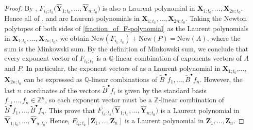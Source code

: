 \documentclass[11pt]{article}
\numberwithin{equation}{section}
\numberwithin{equation}{section}
\begin{document}
\begin{proof}
 By \cite[Theorem 3.1]{BCDX2023}, $F_{i_{k};t_{k}}\bigl(\mathbf{\hat{Y}}_{1;t_{0}},\dots,\mathbf{\hat{Y}}_{n;t_{0}}\bigr)$ is also a Laurent polynomial in $\mathbf{X}_{1;t_{0}},\dots,\mathbf{X}_{2n;t_{0}}$. Hence all of ,  and  are Laurent polynomials in $\mathbf{X}_{1;t_{0}},\dots,\mathbf{X}_{2n;t_{0}}$. Taking the Newton polytopes of both sides of \eqref{fraction_of_F-polynomial} as the Laurent polynomials in $\mathbf{X}_{1;t_0},\dots, \mathbf{X}_{2n;t_0}$, we obtain
$\text{New}(F_{i_{k};t_{k}})+\text{New}(P)=\text{New}(A)$,
 where the sum is the Minkowski sum. By the definition of Minkowski sum, we conclude that every exponent vector of $F_{i_{k};t_{k}}$ is a $\mathbb{Q}$-linear combination of exponents vectors of $A$ and $P$.
 In particular, the exponent vectors of
  as a Laurent polynomial in $\mathbf{X}_{1;t_0}$,$\dots$, $\mathbf{X}_{2n;t_0}$ can be expressed as $\mathbb{Q}$-linear combinations of $\tilde{B}^{\bullet}f_{1},\dots,\tilde{B}^{\bullet}f_{n}$. However, the last $n$ coordinates of the vectors $\tilde{B}^{\bullet}f_{i}$ is given by the standard basis $f_1,\dots, f_{n}\in\mathbb{Z}^{n}$, so each exponent vector must be a $\mathbb{Z}$-linear combination of $\tilde{B}^{\bullet}f_{1},\dots,\tilde{B}^{\bullet}f_{n}$. This prove that $F_{i_{k};t_{k}}\bigl(\mathbf{\hat{Y}}_{1;t_{0}},\dots,\mathbf{\hat{Y}}_{n;t_{0}}\bigr)$ is a Laurent polynomial in $\mathbf{\hat{Y}}_{1;t_{0}},\dots,\mathbf{\hat{Y}}_{n;t_{0}}$. Hence, $F_{i_k;t_k}[\mathbf{Z}_1,\dots, \mathbf{Z}_n]$ is a Laurent polynomial in $\mathbf{Z}_{1},\dots,\mathbf{Z}_{n}$.


\end{proof}
\end{document}
